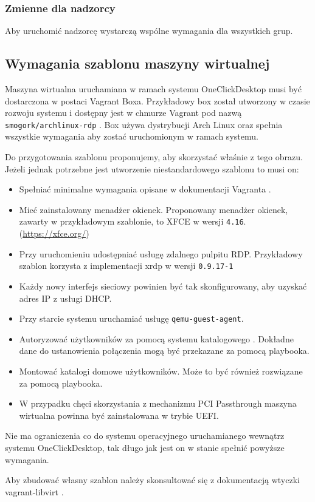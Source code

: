 \documentclass[../opis-rozwiazania.tex]{subfiles}
\begin{document}
\subsubsection{Zmienne dla nadzorcy}
Aby uruchomić nadzorcę wystarczą wspólne wymagania dla wszystkich grup.

\subsection{Wymagania szablonu maszyny wirtualnej}
\label{system_requirements.vagrant_box}
Maszyna wirtualna uruchamiana w ramach systemu OneClickDesktop musi być dostarczona w postaci Vagrant Boxa.
Przykładowy box został utworzony w czasie rozwoju systemu i dostępny jest w chmurze Vagrant pod nazwą \texttt{smogork/archlinux-rdp} \parencite{ocd-vbox}.
Box używa dystrybucji Arch Linux oraz spełnia wszystkie wymagania aby zostać uruchomionym w ramach systemu.

Do przygotowania szablonu proponujemy, aby skorzystać właśnie z tego obrazu.
Jeżeli jednak potrzebne jest utworzenie niestandardowego szablonu to musi on:
\begin{itemize}
  \item Spełniać minimalne wymagania opisane w dokumentacji Vagranta \parencite{vagrant-basebox}.
  \item Mieć zainstalowany menadżer okienek. Proponowany menadżer okienek, zawarty w przykładowym szablonie, to XFCE w wersji \texttt{4.16}. (\url{https://xfce.org/})
  \item Przy uruchomieniu udostępniać usługę zdalnego pulpitu RDP. Przykładowy szablon korzysta z implementacji xrdp w wersji \texttt{0.9.17-1}
  \item Każdy nowy interfejs sieciowy powinien być tak skonfigurowany, aby uzyskać adres IP z usługi DHCP.
  \item Przy starcie systemu uruchamiać usługę \texttt{qemu-guest-agent}.
  \item Autoryzować użytkowników za pomocą systemu katalogowego \parencite{ldap-wiki}. Dokładne dane do ustanowienia połączenia mogą być przekazane za pomocą playbooka.
  \item Montować katalogi domowe użytkowników. Może to być również rozwiązane za pomocą playbooka.
  \item W przypadku chęci skorzystania z mechanizmu PCI Passthrough maszyna wirtualna powinna być zainstalowana w trybie UEFI.
\end{itemize}
Nie ma ograniczenia co do systemu operacyjnego uruchamianego wewnątrz systemu OneClickDesktop, tak długo jak jest on w stanie spełnić powyższe wymagania.

Aby zbudować własny szablon należy skonsultować się z dokumentacją wtyczki vagrant-libvirt \parencite{vlibvirt-box}.
\end{document}
